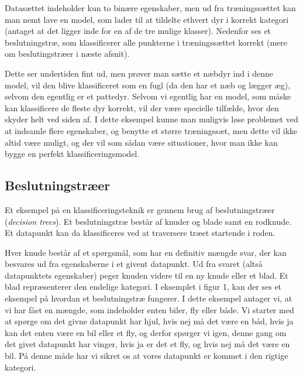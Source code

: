 \documentclass{article}
\begin{document}
Datasættet indeholder kun to binære egenskaber, men ud fra træningssættet kan man nemt lave en model, som lader til at tildelte ethvert dyr i korrekt kategori (antaget at det ligger inde for en af de tre mulige klasser). Nedenfor ses et beslutningstræ, som klassificerer alle punkterne i træningssættet korrekt (mere om beslutingstræer i næste afsnit).

\begin{center}
\end{center}
Dette ser undertiden fint ud, men prøver man sætte et næbdyr ind i denne model, vil den blive klassificeret som en fugl (da den har et næb og lægger æg), selvom den egentlig er et pattedyr. Selvom vi egentlig har en model, som måske kan klassificere de fleste dyr korrekt, vil der være specielle tilfælde, hvor den skyder helt ved siden af. I dette eksempel kunne man muligvis løse problemet ved at indsamle flere egenskaber, og benytte et større træningssæt, men dette vil ikke altid være muligt, og der vil som sådan være situationer, hvor man ikke kan bygge en perfekt klassificeringsmodel.


\subsection{Beslutningstræer}
Et eksempel på en klassificeringsteknik er gennem brug af beslutningstræer (\textit{decision trees}). Et beslutningstræ består af knuder og blade samt en rodknude. Et datapunkt kan da klassificeres ved at traversere træet startende i roden.

Hver knude består af et spørgsmål, som har en definitiv mængde svar, der kan besvares ud fra egenskaberne i et givent datapunkt. Ud fra svaret (altså datapunktets egenskaber) peger knuden videre til en ny knude eller et blad. Et blad repræsenterer den endelige kategori. I eksemplet i figur 1, kan der ses et eksempel på hvordan et beslutningstræ fungerer. I dette eksempel antager vi, at vi har fået en mængde, som indeholder enten biler, fly eller både. Vi starter med at spørge om det givne datapunkt har hjul, hvis nej må det være en båd, hvis ja kan det enten være en bil eller et fly, og derfor spørger vi igen, denne gang om det givet datapunkt har vinger, hvis ja er det et fly, og hvis nej må det være en bil. På denne måde har vi sikret os at vores datapunkt er kommet i den rigtige kategori.
\end{document}
